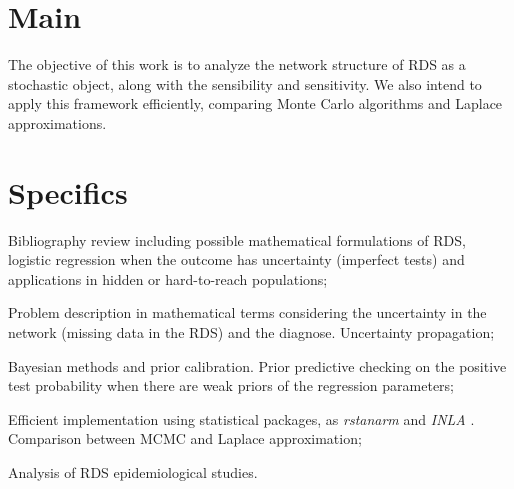 \section{Main}

The objective of this work is to analyze the network structure of RDS as a
stochastic object, along with the sensibility and sensitivity. We also intend
to apply this framework efficiently, comparing Monte Carlo algorithms and
Laplace approximations.



\section{Specifics}

\begin{alineas}
    \item Bibliography review including possible mathematical formulations of
    RDS, logistic regression when the outcome has uncertainty (imperfect
    tests) and applications in hidden or hard-to-reach populations; 

    \item Problem description in mathematical terms considering the
    uncertainty in the network (missing data in the RDS) and the
    diagnose. Uncertainty propagation; 

    \item Bayesian methods and prior calibration. Prior predictive checking on
    the positive test probability when there are weak priors of the
    regression parameters; 

    \item Efficient implementation using statistical packages, as {\em
    rstanarm} \cite{rstanarm} and {\em INLA} \cite{rue2009approximate}. Comparison between MCMC and Laplace
    approximation; 

    \item Analysis of RDS epidemiological studies.
\end{alineas}
